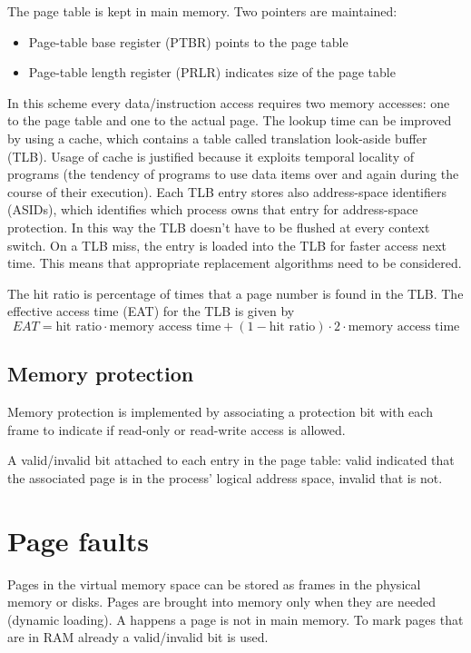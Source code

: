 
The page table is kept in main memory. Two pointers are maintained:
\begin{itemize}
    \item Page-table base register (PTBR) points to the page table
    \item Page-table length register (PRLR) indicates size of the page table
\end{itemize}
In this scheme every data/instruction access requires two memory accesses: one to the page table and one to the actual page. The lookup time can be improved by using a cache, which contains a table called translation look-aside buffer (TLB). Usage of cache is justified because it exploits temporal locality of programs (the tendency of programs to use data items over and again during the course of their execution). Each TLB entry stores also address-space identifiers (ASIDs), which identifies which process owns that entry for address-space protection. In this way the TLB doesn't have to be flushed at every context switch. On a TLB miss, the entry is loaded into the TLB for faster access next time. This means that appropriate replacement algorithms need to be considered.

The hit ratio is percentage of times that a page number is found in the TLB. The effective access time (EAT) for the TLB is given by
$$ EAT = \text{hit ratio}\cdot \text{memory access time} + (1-\text{hit ratio})\cdot 2 \cdot \text{memory access time} $$


\subsection{Memory protection}
Memory protection is implemented by associating a protection bit with each frame to indicate if read-only or read-write access is allowed. 

A valid/invalid bit attached to each entry in the page table: valid indicated that the associated page is in the process' logical address space, invalid that is not.

\section{Page faults}

Pages in the virtual memory space can be stored as frames in the physical memory or disks. Pages are brought into memory only when they are needed (dynamic loading). A  happens a page is not in main memory. To mark pages that are in RAM already a valid/invalid bit is used.

